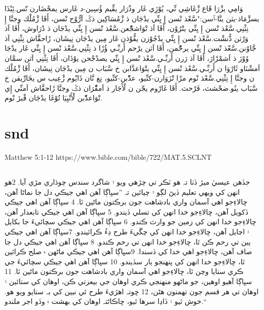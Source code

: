 \documentclass[12pt,fleqn,titlepage,twoside,a4paper]{book}
\begin{document}
\begin{arab}[utf]

وَامِي يژْرَا قَاع ڒْغَاشِي نِّي، يُوْڒِي غَار وذْرَار يقِّيم ؤُسِين-د غَارس يمحْضَارن نّس.ئِبْذَا يسڒْمَاذ-يثن ينَّا-ٱسن:"سَّعْذ نْسن إِ يِنِّي يدْجَان ذ ڒْمُسَاكِين ذݣ اَرُّوْح نْسن، أَقَا ڒْمُلْك وجنَّا إِ نِثْنِي.سَّعْذ نْسن إِ يِنِّي يتْرُوْن، أَقَا اَذ تْوَاشجّْعن.سَّعْذ نْسن إِ يِنِّي يدْجَان ذ دْرَاوش، أَقَا اَذ وَرْثن دُّنشْت.سَّعْذ نْسن إِ يِنِّي يدْجُوْزن يفُّوْذن غَار مِين يدْجَان نِيشَان، ڒَاحقَّاش نِثْنِي اَذ جَّاوْنن.سَّعْذ نْسن إِ يِنِّي يرحّْمن، أَقَا اَثن يرْحم أَربِّـي ؤُڒَا ذ نِثْنِي.سَّعْذ نْسن إِ يِنِّي غَار يدْجَا وُوْڒ ذ اَشمْڒَاڒ، أَقَا اَذ ژرن أَربِّـي.سَّعْذ نْسن إِ يِنِّي يصدْجْحن يوْذَان، أَقَا نِثْنِي اَثن سمَّان اَمشْنَاو ثَارْوَا ن أَربِّـي.سَّعْذ نْسن إِ يِنِّي يتْوَاعدَّابن خ سَّبَاب ن مِين يدْجَان نِيشَان، أَقَا ڒْمُلْك ن وجنَّا إِ نِثْنِي.سَّعْذ نْوم مڒَا تْزَوَارن-كنِّيو، عدّْبن-كنِّيو، نِغ نَّان ذَايْوم ڒْعِيب س يخَارِّيقن خ سَّبَاب ينُو.ضحْشث، فَرْحث. أَقَا غَارْوم يجّن ن لْأَجَار ذ اَمقّْرَان ذݣ وجنَّا ڒَاحقَّاش اَمنِّي إِي تْوَاعدّْبن لْأَنْبِيَا تُوْغَا يدْجَان قْبڒ نْوم.

\end{arab}

\section{snd}

Matthew 5:1-12 https://www.bible.com/bible/722/MAT.5.SCLNT

\begin{arab}[utf]


\section*{}


جڏھن عيسيٰ ميڙ ڏٺا تہ ھو ٽڪر تي چڙھي ويو ۽ شاگرد سندس چوڌاري مڙي آيا. 2ھو انھن کي ويھي تعليم ڏيڻ لڳو ۽ چيائين تہ ”سڀاڳا آھن اھي جيڪي دل جا نماڻا آھن،
ڇالاءِ⁠جو اھي آسمان واري بادشاھت جون برڪتون ماڻين ٿا.
4 سڀاڳا آھن اھي جيڪي ڏکويل آھن،
ڇالاءِ⁠جو خدا انھن کي تسلي ڏيندو.
5 سڀاڳا آھن اھي جيڪي تابعدار آھن،
ڇالاءِ⁠جو خدا انھن کي زمين جو وارث ڪندو.
6 سڀاڳا آھن اھي جيڪي سچائيءَ جا بکايل ۽ اڃايل آھن،
ڇالاءِ⁠جو خدا انھن کي چڱيءَ طرح ڍءُ ڪرائيندو.
7سڀاڳا آھن اھي جيڪي ٻين تي رحم ڪن ٿا،
ڇالاءِ⁠جو خدا انھن تي رحم ڪندو.
8 سڀاڳا آھن اھي جيڪي دل جا صاف آھن،
ڇالاءِ⁠جو اھي خدا کي ڏسندا.
9سڀاڳا آھن اھي جيڪي ماڻھن ۾ صلح ڪرائين ٿا،
ڇالاءِ⁠جو خدا انھن کي پنھنجو ٻار سڏيندو.
10 سڀاڳا آھن اھي جيڪي سچائيءَ جي ڪري ستايا وڃن ٿا،
ڇالاءِ⁠جو اھي آسمان واري بادشاھت جون برڪتون ماڻين ٿا.
11 سڀاڳا آھيو اوھين، جو ماڻھو منھنجي ڪري اوھان جي بي⁠عزتي ڪن، اوھان کي ستائين ۽ اوھان تي ھر قسم جون تھمتون ھڻن، 12 ڇوتہ اھڙيءَ طرح ئي نبين کي بہ ستايو ويو ھو. خوش ٿيو ۽ ڏاڍا سرھا ٿيو، ڇاڪاڻ⁠تہ اوھان کي بھشت ۾ وڏو اجر ملندو.“


\end{arab}
\end{document}

